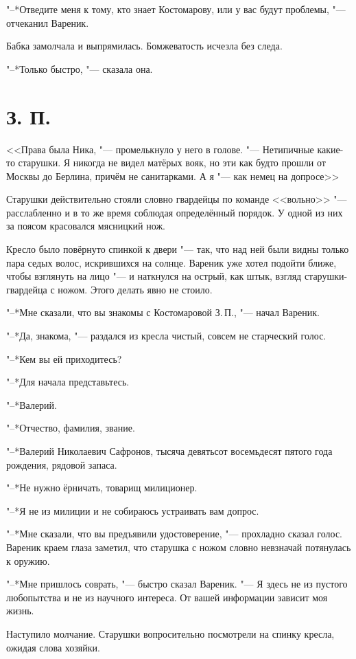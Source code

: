 "--*Отведите меня к тому, кто знает Костомарову, или у вас будут проблемы, "--- отчеканил Вареник.

Бабка замолчала и выпрямилась.
Бомжеватость исчезла без следа.

"--*Только быстро, "--- сказала она.

\section{З. П.}

<<Права была Ника, "--- промелькнуло у него в голове.
"--- Нетипичные какие-то старушки.
Я никогда не видел матёрых вояк, но эти как будто прошли от Москвы до Берлина, причём не санитарками.
А я "--- как немец на допросе\ldotst>>

Старушки действительно стояли словно гвардейцы по команде <<вольно>> "--- расслабленно и в то же время соблюдая определённый порядок.
У одной из них за поясом красовался мясницкий нож.

Кресло было повёрнуто спинкой к двери "--- так, что над ней были видны только пара седых волос, искрившихся на солнце.
Вареник уже хотел подойти ближе, чтобы взглянуть на лицо "--- и наткнулся на острый, как штык, взгляд старушки-гвардейца с ножом.
Этого делать явно не стоило.

"--*Мне сказали, что вы знакомы с Костомаровой З.\,П., "--- начал Вареник.

"--*Да, знакома, "--- раздался из кресла чистый, совсем не старческий голос.

"--*Кем вы ей приходитесь?

"--*Для начала представьтесь.

"--*Валерий.

"--*Отчество, фамилия, звание.

"--*Валерий Николаевич Сафронов, тысяча девятьсот восемьдесят пятого года рождения, рядовой запаса.

"--*Не нужно ёрничать, товарищ милиционер.

"--*Я не из милиции и не собираюсь устраивать вам допрос.

"--*Мне сказали, что вы предъявили удостоверение, "--- прохладно сказал голос.
Вареник краем глаза заметил, что старушка с ножом словно невзначай потянулась к оружию.

"--*Мне пришлось соврать, "--- быстро сказал Вареник.
"--- Я здесь не из пустого любопытства и не из научного интереса.
От вашей информации зависит моя жизнь.

Наступило молчание.
Старушки вопросительно посмотрели на спинку кресла, ожидая слова хозяйки.

